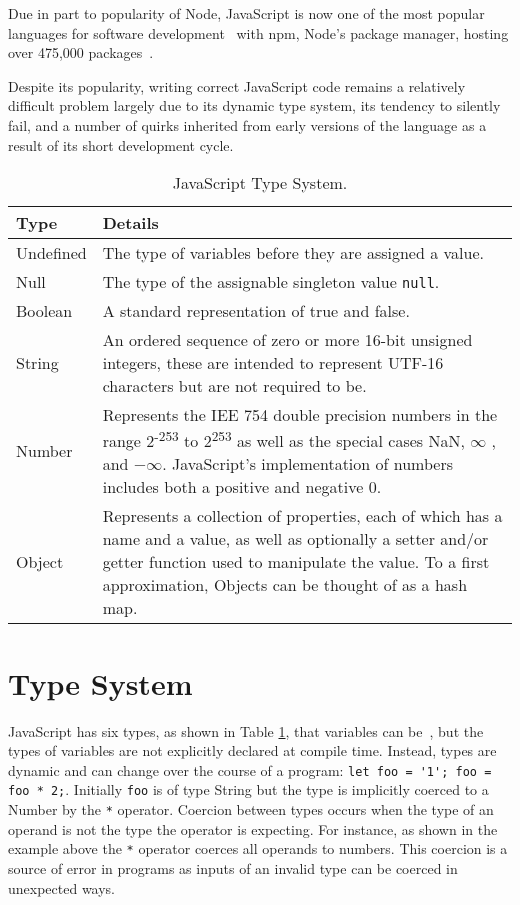 \documentclass[]{final_report}
\begin{document}
Due in part to popularity of Node, JavaScript is now one of the most popular languages for software development~\cite{stackoverflowsurvey, tiobeindex2017nov} with npm, Node's package manager, hosting over 475,000 packages~\cite{npm}.

Despite its popularity, writing correct JavaScript code remains a relatively difficult problem largely due to its dynamic type system, its tendency to silently fail, and a number of quirks inherited from early versions of the language as a result of its short development cycle.


\begin{table}[t]
\centering

\begin{tabular}{|p{2cm}|p{12cm}|}
\hline
Type & Details \\ \hline
Undefined & The type of variables before they are assigned a value. \\ \hline
Null & The type of the assignable singleton value \lstinline|null|. \\ \hline
Boolean & A standard representation of true and false. \\ \hline
String & An ordered sequence of zero or more 16-bit unsigned integers, these are intended to represent UTF-16 characters but are not required to be. \\ \hline
Number & Represents the IEE 754 double precision numbers in the range 2\textsuperscript{-253} to 2\textsuperscript{253} as well as the special cases NaN, $\infty$ , and $ -\infty$. JavaScript's implementation of numbers includes both a positive and negative 0. \\ \hline
Object & Represents a collection of properties, each of which has a name and a value, as well as optionally a setter and/or getter function used to manipulate the value. To a first approximation, Objects can be thought of as a hash map. \\ \hline
\end{tabular}
\caption{JavaScript Type System.}
\label{type-system}
\end{table}

\section{Type System}
JavaScript has six types, as shown in Table \ref{type-system}, that variables can be~\cite{EcmaScript}, but the types of variables are not explicitly declared at compile time. Instead, types are dynamic and can change over the course of a program: \lstinline{let foo = '1'; foo = foo * 2;}. Initially \lstinline{foo} is of type String but the type is implicitly coerced to a Number by the \lstinline{*} operator. Coercion between types occurs when the type of an operand is not the type the operator is expecting. For instance, as shown in the example above the \lstinline{*} operator coerces all operands to numbers. This coercion is a source of error in programs as inputs of an invalid type can be coerced in unexpected ways.
\end{document}
